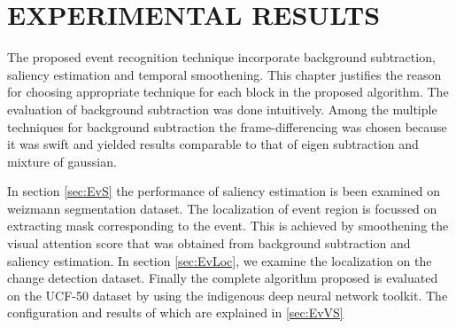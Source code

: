 \chapter{EXPERIMENTAL RESULTS}
\label{chap:exp}
The proposed event recognition technique incorporate background subtraction, saliency estimation and temporal smoothening. This chapter justifies the reason for choosing appropriate technique for each block in the proposed algorithm. The evaluation of background subtraction was done intuitively. Among the multiple techniques for background subtraction the frame-differencing was chosen because it was swift and yielded results comparable to that of eigen subtraction and mixture of gaussian. 
\par In section \ref{sec:EvS} the performance of saliency estimation is been examined on  weizmann segmentation dataset. The localization of event region is focussed on extracting mask corresponding to the event. This is achieved by smoothening the  visual attention score that was obtained from background subtraction and saliency estimation. In section \ref{sec:EvLoc}, we examine the localization on the change detection dataset.
Finally the complete algorithm proposed is evaluated on the UCF-50 dataset by using the indigenous deep neural network toolkit. The configuration and results of which are explained in \ref{sec:EvVS}

